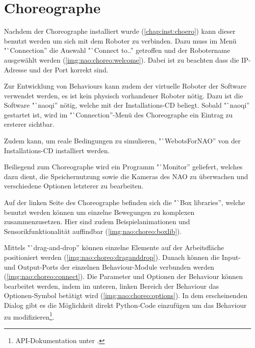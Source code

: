 \chapter{Choreographe}

    Nachdem der Choreographe installiert wurde (\ref{chap:inst:choero}) kann
    dieser benutzt werden um sich mit dem Roboter zu verbinden.
    Dazu muss im Menü "`Connection'' die Auswahl "`Connect to..'' getroffen
    und der Robotername ausgewählt werden (\autoref{img:nao:choreo:welcome}).
    Dabei ist zu beachten dass die \ac{IP}-Adresse und der Port korrekt sind.

    Zur Entwicklung von Behaviours kann zudem der virtuelle Roboter der
    Software verwendet werden, es ist kein physisch vorhandener Roboter nötig.
    Dazu ist die Software "`naoqi'' nötig, welche mit der Installations-\ac{CD}
    beliegt.
    Sobald "`naoqi'' gestartet ist, wird im "`Connection''-Menü des Choreographe
    ein Eintrag zu ersterer sichtbar.

    Zudem kann, um reale Bedingungen zu simulieren, "`WebotsForNAO'' von der
    Installations-\ac{CD} installiert werden.

    Beiliegend zum Choreographe wird ein Programm "`Monitor'' geliefert, welches
    dazu dient, die Speichernutzung sowie die Kameras des NAO zu überwachen und
    verschiedene Optionen letzterer zu bearbeiten.


    Auf der linken Seite des Choreographe befinden sich die "`Box libraries'',
    welche benutzt werden können um einzelne Bewegungen zu komplexen
    zusammenzusetzen.
    Hier sind zudem Beispielanimationen und Sensorikfunktionalität auffindbar
    (\autoref{img:nao:choreo:boxlib}).

    Mittels "`drag-and-drop'' können einzelne Elemente auf der Arbeitsfläche
    positioniert werden (\autoref{img:nao:choreo:draganddrop}).
    Danach können die Input- und Output-Ports der einzelnen Behaviour-Module
    verbunden werden (\autoref{img:nao:choreo:connect}).
    Die Parameter und Optionen der Behaviour können bearbeitet werden, indem im
    unteren, linken Bereich der Behaviour das Optionen-Symbol betätigt wird
    (\autoref{img:nao:choreo:options}).
    In dem erscheinenden Dialog gibt es die Möglichkeit direkt Python-Code
    einzufügen um das Behaviour zu modifizieren\footnote{
        \ac{API}-Dokumentation unter \cite{nao:api}.
    }.


